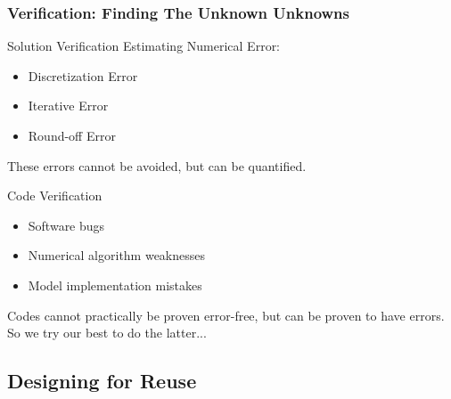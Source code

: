 \begin{frame}
\frametitle{Verification: Finding The Unknown Unknowns}
\begin{block}{Solution Verification}
Estimating Numerical Error:
\begin{itemize}
\item Discretization Error
\item Iterative Error
\item Round-off Error
\end{itemize}
These errors cannot be avoided, but can be quantified.
\end{block}
\begin{block}{Code Verification}
\begin{itemize}
\item Software bugs
\item Numerical algorithm weaknesses
\item Model implementation mistakes
\end{itemize}
Codes cannot practically be proven error-free, but can be proven to
have errors.  So we try our best to do the latter...

\end{block}

\end{frame}


\subsection{Designing for Reuse}

